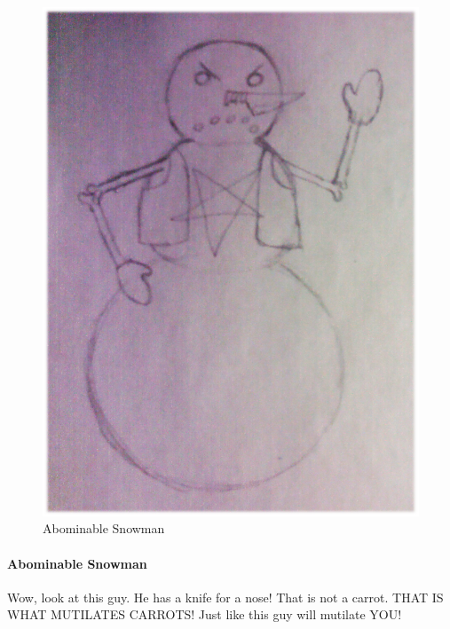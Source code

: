 \documentclass{article}
\begin{document}
\begin{figure}[h!]
\includegraphics[width=5in]{Graphics/Snowman.png}
\caption{Abominable Snowman}
\label{SnowmanPic}
\end{figure}

\paragraph{Abominable Snowman}
Wow, look at this guy.  He has a knife for a nose!  That is not a carrot.  THAT IS WHAT MUTILATES CARROTS!  Just like this guy will mutilate YOU!
\end{document}
